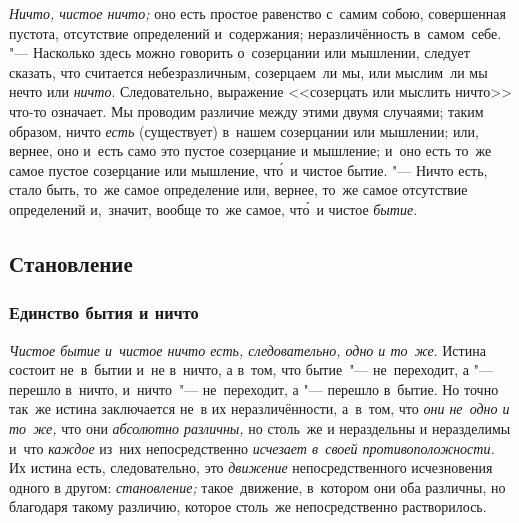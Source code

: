 {\em Ничто, чистое ничто;} оно есть простое равенство с~самим собою,
совершенная пустота, отсутствие определений и~содержания; неразличённость
в~самом~себе. "--- Насколько здесь можно говорить о~созерцании или мышлении,
следует сказать, что считается небезразличным, созерцаем~ли мы, или мыслим~ли
мы нечто или {\em ничто}. Следовательно, выражение <<созерцать или мыслить ничто>>
что-то означает. Мы проводим различие между этими двумя
случаями; таким образом, ничто {\em есть} (существует) в~нашем созерцании или
мышлении; или, вернее, оно и~есть само это пустое созерцание и мышление; и~оно
есть то~же самое пустое созерцание или мышление, чт\'{о}~и чистое бытие. "---
Ничто есть, стало быть, то~же самое определение или, вернее, то~же самое
отсутствие определений и,~значит, вообще то~же самое,
чт\'{о}~и чистое {\em бытие}.

\subsection{Становление}

\subsubsection{Единство бытия и ничто}

{\em Чистое бытие и~чистое ничто есть, следовательно, одно и то~же}. Истина
состоит не~в~бытии и~не в~ничто, а в~том, что бытие~"--- не~переходит, а "---
перешло в~ничто, и~ничто~"--- не~переходит, а "--- перешло в~бытие. Но точно
так~же истина заключается не~в их неразличённости, а~в~том, что
{\em они не~одно и то~же,} что они {\em абсолютно различны,} но столь~же и
нераздельны и неразделимы и~что {\em каждое} из~них непосредственно
{\em исчезает в~своей противоположности.} Их истина есть, следовательно, это
{\em движение} непосредственного исчезновения одного в другом:
{\em становление;} такое~движение, в~котором они оба различны,
но благодаря такому различию, которое столь~же непосредственно растворилось.



